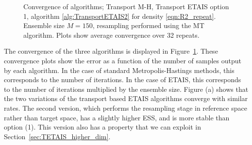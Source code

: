 \documentclass[final]{siamltex}
\newcommand{\edit}[1]{#1}
\begin{document}
\begin{figure}[!ht]
\centering
{}
\caption{Convergence of algorithms; Transport M-H,
  Transport ETAIS option 1, algorithm \ref{alg:TransportETAIS2} for
  density \eqref{eqn:R2_repeat}. Ensemble size $M=150$, resampling
  performed using the MT algorithm. \edit{Plots show average
    convergence over 32 repeats.}}
\label{fig:R2_l2_convergence}
\end{figure}

The convergence of the three algorithms is displayed in
Figure~\ref{fig:R2_l2_convergence}. \edit{These convergence plots show
  the error as a function of the number of samples output by each
  algorithm. In the case of standard Metropolis-Hastings methods, this
  corresponds to the number of iterations. In the case of ETAIS, this
  corresponds to the number of iterations multiplied by the ensemble
  size.} Figure (a) shows that the two
variations of the transport based ETAIS algorithms converge with
similar rates. The second version, which performs the resampling stage
in reference space rather than target space, has a slightly higher
ESS, and is more stable than option (1). This version also has a
property that we can exploit in Section~\ref{sec:TETAIS_higher_dim}.
\end{document}
